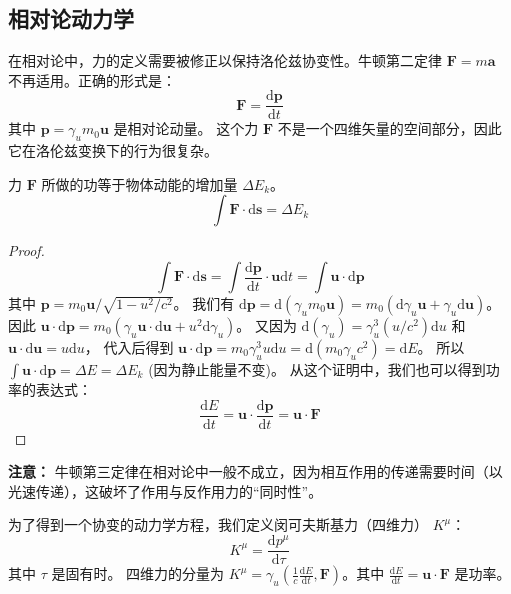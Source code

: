 \documentclass[fontset=none]{ctexart}
\begin{document}
\subsection{相对论动力学}
在相对论中，力的定义需要被修正以保持洛伦兹协变性。牛顿第二定律 $\bm{F} = m\bm{a}$ 不再适用。正确的形式是：
\begin{equation}
\bm{F} = \frac{\mathrm{d}\bm{p}}{\mathrm{d}t}
\end{equation}
其中 $\bm{p} = \gamma_u m_0 \bm{u}$ 是相对论动量。
这个力 $\bm{F}$ 不是一个四维矢量的空间部分，因此它在洛伦兹变换下的行为很复杂。
\begin{theorem}[功能关系]
力 $\bm{F}$ 所做的功等于物体动能的增加量 $\Delta E_k$。
\begin{equation}
\int \bm{F} \cdot \mathrm{d}\bm{s} = \Delta E_k
\end{equation}
\begin{proof}
\begin{equation}
\int \bm{F} \cdot \mathrm{d}\bm{s} = \int \frac{\mathrm{d}\bm{p}}{\mathrm{d}t} \cdot \bm{u}\mathrm{d}t = \int \bm{u} \cdot \mathrm{d}\bm{p}
\end{equation}
其中 $\bm{p} = m_0\bm{u}/\sqrt{1-u^2/c^2}$。
我们有 $\mathrm{d}\bm{p} = \mathrm{d}(\gamma_u m_0 \bm{u}) = m_0(\mathrm{d}\gamma_u \bm{u} + \gamma_u \mathrm{d}\bm{u})$。
因此 $\bm{u}\cdot\mathrm{d}\bm{p} = m_0(\gamma_u \bm{u}\cdot\mathrm{d}\bm{u} + u^2\mathrm{d}\gamma_u)$。
又因为 $\mathrm{d}(\gamma_u) = \gamma_u^3 (u/c^2) \mathrm{d}u$ 和 $\bm{u}\cdot\mathrm{d}\bm{u} = u\mathrm{d}u$，
代入后得到 $\bm{u}\cdot\mathrm{d}\bm{p} = m_0 \gamma_u^3 u \mathrm{d}u = \mathrm{d}(m_0\gamma_u c^2) = \mathrm{d}E$。
所以 $\int \bm{u} \cdot \mathrm{d}\bm{p} = \Delta E = \Delta E_k$ (因为静止能量不变)。
从这个证明中，我们也可以得到功率的表达式：
\begin{equation}
\frac{\mathrm{d}E}{\mathrm{d}t} = \bm{u} \cdot \frac{\mathrm{d}\bm{p}}{\mathrm{d}t} = \bm{u} \cdot \bm{F}
\end{equation}
\end{proof}
\end{theorem}
\textbf{注意：} 牛顿第三定律在相对论中一般不成立，因为相互作用的传递需要时间（以光速传递），这破坏了作用与反作用力的“同时性”。

\begin{definition}[闵可夫斯基力]
为了得到一个协变的动力学方程，我们定义闵可夫斯基力（四维力） $K^{\mu}$：
\begin{equation}
K^{\mu} = \frac{\mathrm{d}p^{\mu}}{\mathrm{d}\tau}
\end{equation}
其中 $\tau$ 是固有时。
四维力的分量为 $K^{\mu} = \gamma_u (\frac{1}{c}\frac{\mathrm{d}E}{\mathrm{d}t}, \bm{F})$。其中 $\frac{\mathrm{d}E}{\mathrm{d}t} = \bm{u}\cdot\bm{F}$ 是功率。
\end{definition}
\end{document}
